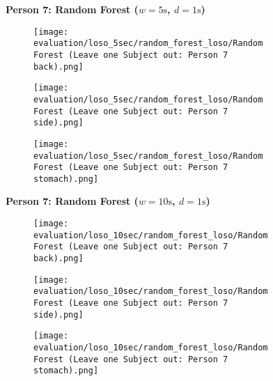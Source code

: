 \begin{figure}
    \textbf{Person 7: Random Forest ($w=5\si{\s}$, $d=1\si{\s}$)}
      \centering
      \begin{subfigure}{1\textwidth}
          \texttt{[image: evaluation/loso\_5sec/random\_forest\_loso/Random Forest (Leave one Subject out: Person 7 back).png]}
        \end{subfigure}
        \begin{subfigure}{1\textwidth}
          \texttt{[image: evaluation/loso\_5sec/random\_forest\_loso/Random Forest (Leave one Subject out: Person 7 side).png]}
        \end{subfigure}
        \begin{subfigure}{1\textwidth}
          \texttt{[image: evaluation/loso\_5sec/random\_forest\_loso/Random Forest (Leave one Subject out: Person 7 stomach).png]}
      \end{subfigure}
        \textbf{Person 7: Random Forest ($w=10\si{\s}$, $d=1\si{\s}$)}
      \centering
      \begin{subfigure}{1\textwidth}
          \texttt{[image: evaluation/loso\_10sec/random\_forest\_loso/Random Forest (Leave one Subject out: Person 7 back).png]}
        \end{subfigure}
        \begin{subfigure}{1\textwidth}
          \texttt{[image: evaluation/loso\_10sec/random\_forest\_loso/Random Forest (Leave one Subject out: Person 7 side).png]}
        \end{subfigure}
        \begin{subfigure}{1\textwidth}
          \texttt{[image: evaluation/loso\_10sec/random\_forest\_loso/Random Forest (Leave one Subject out: Person 7 stomach).png]}
      \end{subfigure}
  
      \label{evaluation:xgboost_loso:person6}
\end{figure}
